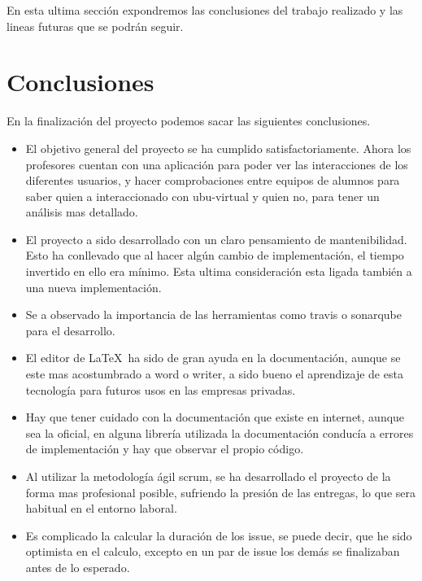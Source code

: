 
En esta ultima sección expondremos las conclusiones del trabajo realizado y las lineas futuras que se podrán seguir.

\section{Conclusiones}\label{conclusiones}

En la finalización del proyecto podemos sacar las siguientes conclusiones.

\begin{itemize}
	\tightlist
	\item
	El objetivo general del proyecto se ha cumplido satisfactoriamente.
	Ahora los profesores cuentan con una aplicación para poder ver las interacciones de los diferentes usuarios, y hacer comprobaciones entre equipos de alumnos para saber quien a interaccionado con ubu-virtual y quien no, para tener un análisis mas detallado.
	\item
	El proyecto a sido desarrollado con un claro pensamiento de mantenibilidad. Esto ha conllevado que al hacer algún cambio de implementación, el tiempo invertido en ello era mínimo. Esta ultima consideración esta ligada también a una nueva implementación.
	\item
	Se a observado la importancia de las herramientas como travis o sonarqube para el desarrollo.
	\item
	El editor de \LaTeX\ ha sido de gran ayuda en la documentación, aunque se este mas acostumbrado a word o writer, a sido bueno el aprendizaje de esta tecnología para futuros usos en las empresas privadas.
	\item
	Hay que tener cuidado con la documentación que existe en internet, aunque sea la oficial, en alguna librería utilizada la documentación conducía a errores de implementación y hay que observar el propio código.
	\item
	Al utilizar la metodología ágil scrum, se ha desarrollado el proyecto de la forma mas profesional posible, sufriendo la presión de las entregas, lo que sera habitual en el entorno laboral.
	\item
	Es complicado la calcular la duración de los issue, se puede decir, que he sido optimista en el calculo, excepto en un par de issue los demás se finalizaban antes de lo esperado.
	
\end{itemize}


